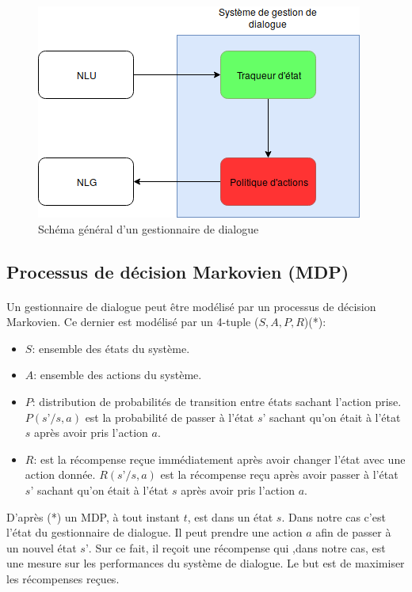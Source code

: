 \begin{figure}[H]
	\centering
	\includegraphics[width=.7\linewidth]{images/DM/DMGeneral.png} 
	\caption{Schéma général d'un gestionnaire de dialogue} 
\end{figure}


	\subsection{Processus de décision Markovien (MDP)}\label{MDP}
	\paragraph{}Un gestionnaire de dialogue peut être modélisé par un processus de décision Markovien\cite{Bel1957}. Ce dernier est modélisé par un 4-tuple ($S,A,P,R$)(*):
	\begin{itemize}
		\item $S$: ensemble des états du système.
		\item $A$: ensemble des actions du système.
		\item $P$: distribution de probabilités de transition entre états sachant l’action prise. $P(s’/s,a)$ est la probabilité de passer à l’état $s’$ sachant qu’on était à l’état $s$ après avoir pris l’action $a$.
		\item $R$: est la récompense reçue immédiatement après avoir changer l’état avec une action donnée. $R(s’/s,a)$ est la récompense reçu après avoir passer à l’état $s’$ sachant qu’on était à l’état $s$ après avoir pris l’action $a$.
	\end{itemize}
	D’après (*) un MDP, à tout instant $t$, est dans un état $s$. Dans notre cas c’est l’état du gestionnaire de dialogue. Il peut prendre une action $a$ afin de passer à un nouvel état $s’$. Sur ce fait, il reçoit une récompense qui ,dans notre cas, est une mesure sur les performances du système de dialogue. Le but est de maximiser les récompenses reçues.
	
